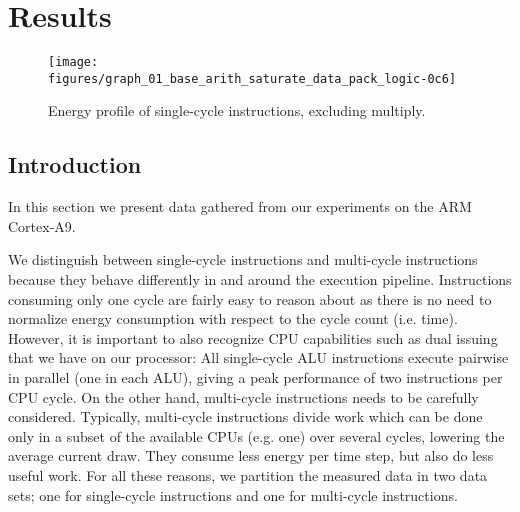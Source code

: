 \section{Results}

%
%
%
%

\begin{figure*}[ht]
    \centering
    \texttt{[image: figures/graph\_01\_base\_arith\_saturate\_data\_pack\_logic-0c6]}
    \caption{Energy profile of single-cycle instructions, excluding multiply.}
    \label{fig:singlecycle}
\end{figure*}


\subsection{Introduction}
In this section we present data gathered from our experiments on the ARM
Cortex-A9.

We distinguish between single-cycle instructions and multi-cycle instructions
because they behave differently in and around the execution pipeline.
Instructions consuming only one cycle are fairly easy to reason about as there
is no need to normalize energy consumption with respect to the cycle count (i.e.
time). However, it is important to also recognize CPU capabilities such as dual
issuing that we have on our processor: All single-cycle ALU instructions execute
pairwise in parallel (one in each ALU), giving a peak performance of two
instructions per CPU cycle. On the other hand, multi-cycle instructions needs to
be carefully considered. Typically, multi-cycle instructions divide work which
can be done only in a subset of the available CPUs (e.g. one) over several
cycles, lowering the average current draw. They consume less energy per time
step, but also do less useful work. For all these reasons, we partition the
measured data in two data sets; one for single-cycle instructions and one for
multi-cycle instructions.

